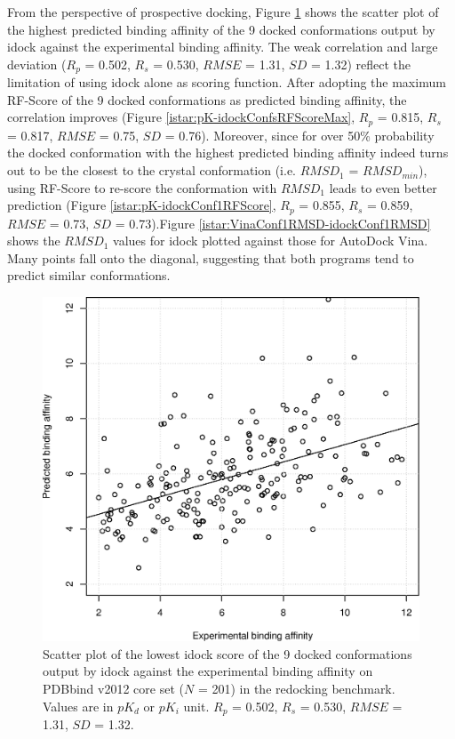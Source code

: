 From the perspective of prospective docking, Figure \ref{istar:pK-idockConf1idock} shows the scatter plot of the highest predicted binding affinity of the 9 docked conformations output by idock against the experimental binding affinity. The weak correlation and large deviation ($R_p$ = 0.502, $R_s$ = 0.530, $RMSE$ = 1.31, $SD$ = 1.32) reflect the limitation of using idock alone as scoring function. After adopting the maximum RF-Score of the 9 docked conformations as predicted binding affinity, the correlation improves (Figure \ref{istar:pK-idockConfsRFScoreMax}, $R_p$ = 0.815, $R_s$ = 0.817, $RMSE$ = 0.75, $SD$ = 0.76). Moreover, since for over 50\% probability the docked conformation with the highest predicted binding affinity indeed turns out to be the closest to the crystal conformation (i.e. $RMSD_1$ = $RMSD_{min}$), using RF-Score to re-score the conformation with $RMSD_1$ leads to even better prediction (Figure \ref{istar:pK-idockConf1RFScore}, $R_p$ = 0.855, $R_s$ = 0.859, $RMSE$ = 0.73, $SD$ = 0.73).Figure \ref{istar:VinaConf1RMSD-idockConf1RMSD} shows the $RMSD_1$ values for idock plotted against those for AutoDock Vina. Many points fall onto the diagonal, suggesting that both programs tend to predict similar conformations.

\begin{figure}
\begin{center}
\includegraphics[width=\linewidth]{../istar/pK-idockConf1idock.eps}
\end{center}
\caption{Scatter plot of the lowest idock score of the 9 docked conformations output by idock against the experimental binding affinity on PDBbind v2012 core set ($N$ = 201) in the redocking benchmark. Values are in $pK_d$ or $pK_i$ unit. $R_p$ = 0.502, $R_s$ = 0.530, $RMSE$ = 1.31, $SD$ = 1.32.}
\label{istar:pK-idockConf1idock}
\end{figure}

